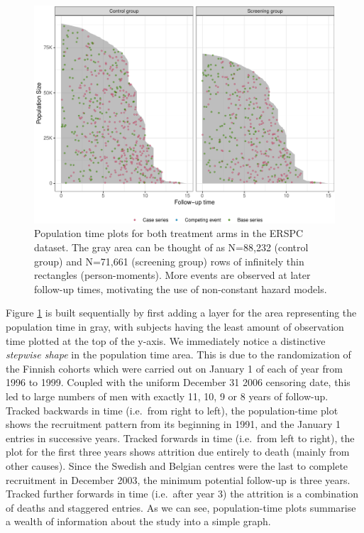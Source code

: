 \begin{Schunk}
\begin{figure}[ht]
\includegraphics[width=\textwidth,keepaspectratio=true]{./plot-stratified-erspc-data-1} \caption[Population time plots for both treatment arms in the ERSPC dataset]{Population time plots for both treatment arms in the ERSPC dataset. The gray area can be thought of as N=88,232 (control group) and N=71,661 (screening group) rows of infinitely thin rectangles (person-moments). More events are observed at later follow-up times, motivating the use of non-constant hazard models.}\label{fig:plot-stratified-erspc-data}
\end{figure}
\end{Schunk}

Figure \ref{fig:plot-stratified-erspc-data} is built sequentially by
first adding a layer for the area representing the population time in
gray, with subjects having the least amount of observation time plotted
at the top of the y-axis. We immediately notice a distinctive
\emph{stepwise shape} in the population time area. This is due to the
randomization of the Finnish cohorts which were carried out on January 1
of each of year from 1996 to 1999. Coupled with the uniform December 31
2006 censoring date, this led to large numbers of men with exactly 11,
10, 9 or 8 years of follow-up. Tracked backwards in time (i.e.~from
right to left), the population-time plot shows the recruitment pattern
from its beginning in 1991, and the January 1 entries in successive
years. Tracked forwards in time (i.e.~from left to right), the plot for
the first three years shows attrition due entirely to death (mainly from
other causes). Since the Swedish and Belgian centres were the last to
complete recruitment in December 2003, the minimum potential follow-up
is three years. Tracked further forwards in time (i.e.~after year 3) the
attrition is a combination of deaths and staggered entries. As we can
see, population-time plots summarise a wealth of information about the
study into a simple graph.

